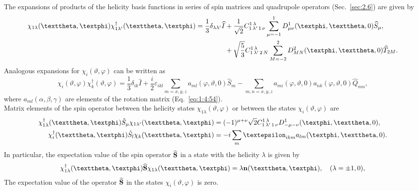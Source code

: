 The expansions of products of the helicity basis functions in series of spin matrices and quadrupole operators (Sec.~\ref{sec:2.6}) are given by
\begin{align}
\chi_{1 \lambda}(\vartheta, \varphi) \chi_{1 \lambda^{\prime}}^{\dagger}(\vartheta, \varphi)=\frac{1}{3} \delta_{\lambda \lambda^{\prime}} \widehat{I} & +\frac{1}{\sqrt{2}} \clebsch{1}{\lambda^{\prime}}{1}{\nu}{1}{\lambda} \sum_{\mu=-1}^{1} D_{\mu \nu}^{1}(\varphi, \vartheta, 0) \widehat{S}_{\mu}, \notag\\
& +\sqrt{\frac{5}{3}} \clebsch{1}{\lambda^{\prime}}{2}{N}{1}{\lambda} \sum_{M=-2}^{2} D_{M N}^{2}(\varphi, \vartheta, 0) \widehat{T}_{2 M} . \label{eq:6:3:54}
\end{align}
Analogous expansions for $\chi_{i}(\vartheta, \varphi)$ can be written as
\begin{equation}
\chi_{i}(\vartheta, \varphi) \chi_{k}^{\dagger}(\vartheta, \varphi)=\frac{1}{3} \delta_{i k} \widehat{I}+\frac{i}{2} \varepsilon_{i k l} \sum_{m=x, y, z} a_{m l}(\varphi, \vartheta, 0) \widehat{S}_{m}-\sum_{m, n=x, y, z} a_{m i}(\varphi, \vartheta, 0) a_{n k}(\varphi, \vartheta, 0) \widehat{Q}_{m n}, \label{eq:6:3:55}
\end{equation}
where $a_{m l}(\alpha, \beta, \gamma)$ are elements of the rotation matrix (Eq.~\eqref{eq:1:4:54}).\\
Matrix elements of the spin operator between the helicity states $\chi_{1 \lambda}(\vartheta, \varphi)$ or between the states $\chi_{i}(\vartheta, \varphi)$ are
\begin{align}
\chi_{1 \lambda}^{\dagger}(\vartheta, \varphi) \hat{S}_{\mu} \chi_{1 \lambda^{\prime}}(\vartheta, \varphi)&=(-1)^{\mu+\nu} \sqrt{2} \clebsch{1}{\lambda^{\prime}}{1}{\nu}{1}{\lambda} D_{-\mu-\nu}^{1}(\varphi, \vartheta, 0), \label{eq:6:3:56}\\
\chi_{i}^{\dagger}(\vartheta, \varphi) \hat{S}_{l} \chi_{k}(\vartheta, \varphi)&=-i \sum_{m} \varepsilon_{i k m} a_{l m}(\varphi, \vartheta, 0) . \label{eq:6:3:57}
\end{align}
In particular, the expectation value of the spin operator $\widehat{\mathbf{S}}$ in a state with the helicity $\lambda$ is given by
\begin{equation}
\chi_{1 \lambda}^{\dagger}(\vartheta, \varphi) \widehat{\vect{S}} \chi_{1 \lambda}(\vartheta, \varphi)=\lambda \vect{n}(\vartheta, \varphi), \quad(\lambda= \pm 1,0), \label{eq:6:3:58}
\end{equation}
The expectation value of the operator $\widehat{\mathbf{S}}$ in the states $\chi_{i}(\vartheta, \varphi)$ is zero.

